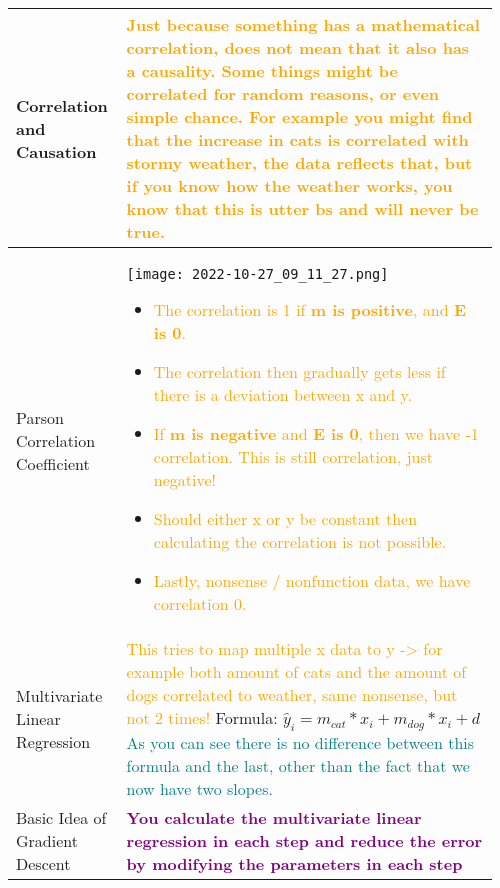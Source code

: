 \documentclass[main.tex,fontsize=8pt,paper=a4,paper=portrait,DIV=calc,]{scrartcl}
\begin{document}
\begin{table}[ht!]
\begin{tabular}{|m{0.2\linewidth}|m{0.755\linewidth}|}
\hline
Correlation and Causation &
\textcolor{orange}{Just because something has a mathematical correlation, does not mean that it also has a causality. Some things might be correlated for random reasons, or even simple chance. \newline
For example you might find that the increase in cats is correlated with stormy weather, the data reflects that, but if you know how the weather works, you know that this is utter bs and will never be true.}\\
\hline
Parson Correlation Coefficient & 
\vspace{2mm}
\texttt{[image: 2022-10-27\_09\_11\_27.png]}\newline
\begin{itemize}
\item \textcolor{orange}{The correlation is 1 if \textbf{m is positive}, and \textbf{E is 0}.}
\item \textcolor{orange}{The correlation then gradually gets less if there is a deviation between x and y.}
\item \textcolor{orange}{If \textbf{m is negative} and \textbf{E is 0}, then we have -1 correlation. This is still correlation, just negative!}
\item \textcolor{orange}{Should either x or y be constant then calculating the correlation is not possible.}
\item \textcolor{orange}{Lastly, nonsense / nonfunction data, we have correlation 0.}
\vspace{-3mm}
\end{itemize}\\
\hline
Multivariate Linear Regression & 
\textcolor{orange}{This tries to map multiple x data to y -> for example both amount of cats and the amount of dogs correlated to weather, same nonsense, but not 2 times!}\newline
Formula: \( \hat{y}_i = m_{cat} * x_i + m_{dog} * x_i + d \)\newline
\textcolor{teal}{As you can see there is no difference between this formula and the last, other than the fact that we now have two slopes.}\\
\hline
Basic Idea of Gradient Descent & 
\textbf{\textcolor{purple}{You calculate the multivariate linear regression in each step and reduce the error by modifying the parameters in each step}}\newline

\end{tabular}
\end{table}
\end{document}

